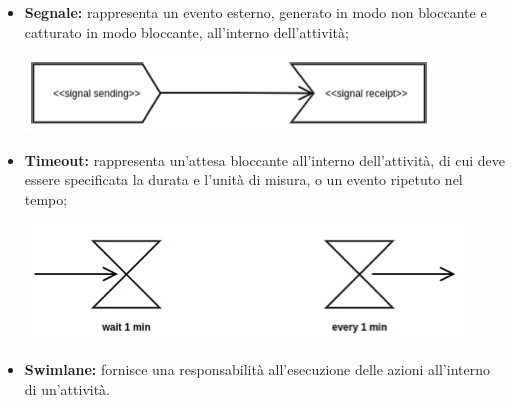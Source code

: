 \begin{itemize}
\begin{center}
\begin{minipage}{0.4\textwidth}
		\end{minipage}
	\end{center}
	\item \textbf{Segnale:} rappresenta un evento esterno, generato in modo non bloccante e catturato in modo bloccante, all'interno dell'attività;
	\begin{center}
		\centering
		\includegraphics[scale=0.5]{Immagini/UML/Segnali}
	\end{center}
	\item \textbf{Timeout:} rappresenta un'attesa bloccante all'interno dell'attività, di cui deve essere specificata la durata e l'unità di misura, o un evento ripetuto nel tempo;
	\begin{center}
		\centering
		\includegraphics[scale=0.5]{Immagini/UML/Timeout}
\end{center}
	\item \textbf{Swimlane:} fornisce una responsabilità all'esecuzione delle azioni all'interno di un'attività.
\end{itemize}

